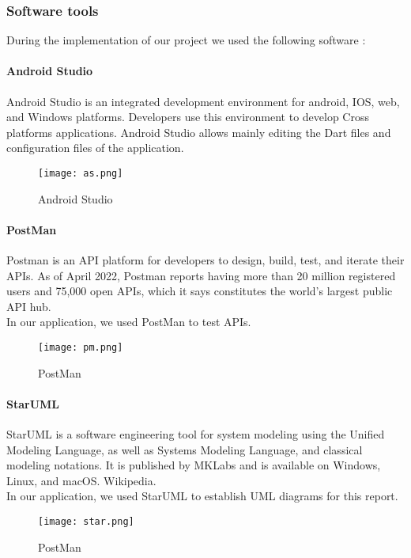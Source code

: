 \subsubsection{Software tools}
During the implementation of our project we used the following software :
\paragraph*{Android Studio}
Android Studio is an integrated development environment for android, IOS, web, and Windows platforms. Developers use this environment
to develop Cross platforms applications. Android Studio allows
mainly editing the Dart files and configuration files of the application.
\begin{figure}[H]%
    \center   
    \texttt{[image: as.png]}
    \caption{Android Studio}
\end{figure}
\paragraph*{PostMan}
Postman is an API platform for developers to design, build, test, and iterate their APIs. As of April 2022, Postman reports having more than 20 million registered users and 75,000 open APIs, which it says constitutes the world's largest public API hub.\\
In our application, we used PostMan to test APIs.
\begin{figure}[H]%
    \center   
    \texttt{[image: pm.png]}
    \caption{PostMan}
\end{figure}
\paragraph*{StarUML}
StarUML is a software engineering tool for system modeling using the Unified Modeling Language, as well as Systems Modeling Language, and classical modeling notations. It is published by MKLabs and is available on Windows, Linux, and macOS. Wikipedia.\\
In our application, we used StarUML to establish UML diagrams for this report.
\begin{figure}[H]%
    \center   
    \texttt{[image: star.png]}
    \caption{PostMan}
\end{figure}
